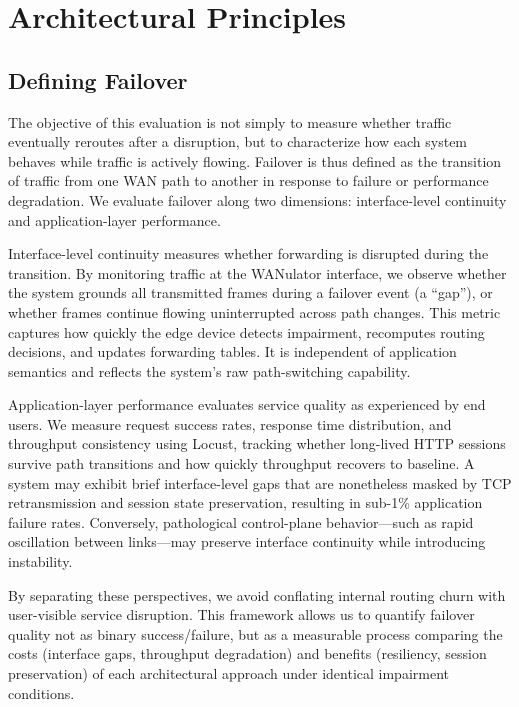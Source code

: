 \documentclass[conference]{IEEEtran}
\begin{document}
\section{Architectural Principles}

\subsection{Defining Failover}

The objective of this evaluation is not simply to measure whether traffic eventually reroutes after a disruption, but to characterize how each system behaves while traffic is actively flowing. Failover is thus defined as the transition of traffic from one WAN path to another in response to failure or performance degradation. We evaluate failover along two dimensions: interface-level continuity and application-layer performance.

Interface-level continuity measures whether forwarding is disrupted during the transition. By monitoring traffic at the WANulator interface, we observe whether the system grounds all transmitted frames during a failover event (a ``gap''), or whether frames continue flowing uninterrupted across path changes. This metric captures how quickly the edge device detects impairment, recomputes routing decisions, and updates forwarding tables. It is independent of application semantics and reflects the system's raw path-switching capability.

Application-layer performance evaluates service quality as experienced by end users. We measure request success rates, response time distribution, and throughput consistency using Locust, tracking whether long-lived HTTP sessions survive path transitions and how quickly throughput recovers to baseline. A system may exhibit brief interface-level gaps that are nonetheless masked by TCP retransmission and session state preservation, resulting in sub-1\% application failure rates. Conversely, pathological control-plane behavior—such as rapid oscillation between links—may preserve interface continuity while introducing instability.

By separating these perspectives, we avoid conflating internal routing churn with user-visible service disruption. This framework allows us to quantify failover quality not as binary success/failure, but as a measurable process comparing the costs (interface gaps, throughput degradation) and benefits (resiliency, session preservation) of each architectural approach under identical impairment conditions.
\end{document}
